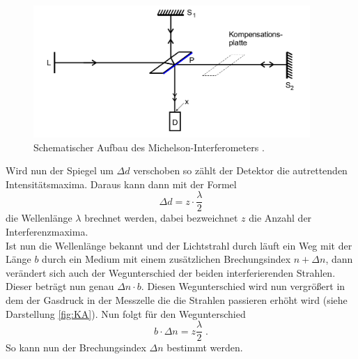 \begin{figure}
  \centering
  \includegraphics[height=5cm]{logos/SchemaInterf.png}
  \caption{Schematischer Aufbau des Michelson-Interferometers \cite{Anleitung}.}
  \label{fig:SA}
\end{figure}

Wird nun der Spiegel um $\Delta d$ verschoben so zählt der Detektor die autrettenden
Intensitätsmaxima. Daraus kann dann mit der Formel \cite{Anleitung}
\begin {equation}
  \Delta d = z \cdot \frac{\lambda}{2}
  \label{eqn:dd}
\end{equation}
die Wellenlänge $\lambda$ brechnet werden, dabei bezweichnet $z$ die Anzahl der
Interferenzmaxima. \\
Ist nun die Wellenlänge bekannt und der Lichtstrahl durch läuft ein Weg mit der
Länge $b$ durch ein Medium mit einem zusätzlichen Brechungsindex $ n + \Delta n$,
dann verändert sich auch der Wegunterschied der beiden interferierenden Strahlen.
Dieser beträgt nun genau $\Delta n \cdot b$. Diesen Wegunterschied wird nun
vergrößert in dem der Gasdruck in der Messzelle die die Strahlen passieren erhöht
wird (siehe Darstellung \ref{fig:KA}). Nun folgt für den Wegunterschied
\begin{equation}
  b \cdot \Delta n = z \frac{\lambda}{2}\;.
  \label{eqn:n}
\end{equation}
So kann nun der Brechungsindex $\Delta n$ bestimmt werden.
